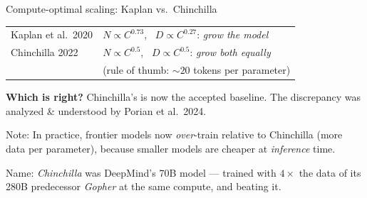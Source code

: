 \documentclass[11pt]{beamer}
\newcommand{\hl}[1]{{\color{blue!60!black}\textbf{#1}}}
\begin{document}
\begin{frame}{Compute-optimal scaling: Kaplan vs.\ Chinchilla}
  \begin{center}
  \begin{tabular}{l|l}
    Kaplan et al.\ 2020 & $N \propto C^{0.73}$, \ $D \propto C^{0.27}$:
    \emph{grow the model} \\
    Chinchilla 2022 &  $N \propto C^{0.5}$, \ $D \propto C^{0.5}$:
    \emph{grow both equally} \\
    & (rule of thumb: $\sim 20$ tokens per parameter)
  \end{tabular}
  \end{center}
  \vspace{1mm}

  \hl{Which is right?} Chinchilla's is now the accepted baseline.
 The discrepancy was analyzed \& understood by Porian et al.\ 2024.
  

\medskip

  Note: In practice, frontier models now \emph{over}-train relative to
  Chinchilla (more data per parameter), because smaller models are cheaper at
  \emph{inference} time.
\medskip

  {\footnotesize Name: \emph{Chinchilla} was DeepMind's 70B model ---
  trained with $4\times$ the data of its 280B predecessor \emph{Gopher}
  at the same compute, and beating it.}
\end{frame}
\end{document}
